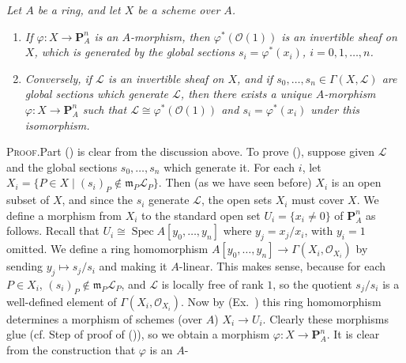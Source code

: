 { \emph{Let $A$ be a ring, and let $X$ be a scheme over $A$.}
\begin{enumerate}[label=(\alph*),leftmargin=2.2em,itemsep=0pt,topsep=2pt,parsep=0pt]
\item\hypertarget{result-II-7.1a}{} \emph{If $\varphi\colon X\to\mathbf P_A^n$ is an $A$-morphism, then $\varphi^*(\mathcal O(1))$ is an invertible sheaf on $X$, which is generated by the global sections $s_i=\varphi^*(x_i)$, $i=0,1,\ldots,n$.}
\item\hypertarget{result-II-7.1b}{} \emph{Conversely, if $\mathcal L$ is an invertible sheaf on $X$, and if $s_0,\ldots,s_n\in\Gamma(X,\mathcal L)$ are global sections which generate $\mathcal L$, then there exists a unique $A$-morphism $\varphi\colon X\to\mathbf P_A^n$ such that $\mathcal L\cong\varphi^*(\mathcal O(1))$ and $s_i=\varphi^*(x_i)$ under this isomorphism.}
\end{enumerate}

\noindent\textsc{Proof.}\enspace Part () is clear from the discussion above. To prove (), suppose given $\mathcal L$ and the global sections $s_0,\ldots,s_n$ which generate it. For each $i$, let $X_i=\{P\in X\mid(s_i)_P\notin\mathfrak m_P\mathcal L_P\}$. Then (as we have seen before) $X_i$ is an open subset of $X$, and since the $s_i$ generate $\mathcal L$, the open sets $X_i$ must cover $X$. We define a morphism from $X_i$ to the standard open set $U_i=\{x_i\ne0\}$ of $\mathbf P_A^n$ as follows. Recall that $U_i\cong\operatorname{Spec}A[y_0,\ldots,y_n]$ where $y_j=x_j/x_i$, with $y_i=1$ omitted. We define a ring homomorphism $A[y_0,\ldots,y_n]\to\Gamma(X_i,\mathcal O_{X_i})$ by sending $y_j\mapsto s_j/s_i$ and making it $A$-linear. This makes sense, because for each $P\in X_i$, $(s_i)_P\notin\mathfrak m_P\mathcal L_P$, and $\mathcal L$ is locally free of rank $1$, so the quotient $s_j/s_i$ is a well-defined element of $\Gamma(X_i,\mathcal O_{X_i})$. Now by (Ex.\ ) this ring homomorphism determines a morphism of schemes (over $A$) $X_i\to U_i$. Clearly these morphisms glue (cf. Step  of proof of ()), so we obtain a morphism $\varphi\colon X\to\mathbf P_A^n$. It is clear from the construction that $\varphi$ is an $A$-
}
